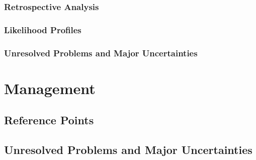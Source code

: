 \documentclass[11pt,
  english,
  a4paper,
]{article}
\begin{document}
\leavevmode\tagmcend\tagstructend


\hypertarget{retrospective-analysis}{%
\subsubsection{Retrospective Analysis}\label{retrospective-analysis}}

\leavevmode\tagmcend\tagstructend


\hypertarget{likelihood-profiles}{%
\subsubsection{Likelihood Profiles}\label{likelihood-profiles}}

\leavevmode\tagmcend\tagstructend


\hypertarget{unresolved-problems-and-major-uncertainties}{%
\subsubsection{Unresolved Problems and Major Uncertainties}\label{unresolved-problems-and-major-uncertainties}}

\leavevmode\tagmcend\tagstructend


\hypertarget{management}{%
\section{Management}\label{management}}

\leavevmode\tagmcend\tagstructend


\hypertarget{reference-points-1}{%
\subsection{Reference Points}\label{reference-points-1}}

\leavevmode\tagmcend\tagstructend


\hypertarget{unresolved-problems-and-major-uncertainties-1}{%
\subsection{Unresolved Problems and Major Uncertainties}\label{unresolved-problems-and-major-uncertainties-1}}
\end{document}
